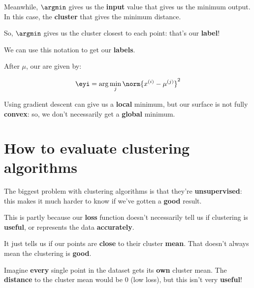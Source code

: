         Meanwhile, $\argmin$ gives us the \textbf{input} value that gives us the minimum output. In this case, the \textbf{cluster} that gives the minimum distance. 
        
        So, $\argmin$ gives us the cluster closest to each point: that's our \textbf{label}!
        
        We can use this notation to get our \textbf{labels}.\\
        
        \begin{notation}
            After  $\mu$, our  are given by:
            
            \begin{equation}
                \eyi = \arg\min_j \norm{ x^{(i)} - \mu^{(j)} }^2
            \end{equation}
        \end{notation}
        
        Using gradient descent can give us a \textbf{local} minimum, but our surface is not fully \textbf{convex}: so, we don't necessarily get a \textbf{global} minimum.

\pagebreak

\section{How to evaluate clustering algorithms}

    The biggest problem with clustering algorithms is that they're \textbf{unsupervised}: this makes it much harder to know if we've gotten a \textbf{good} result.
    
    This is partly because our \textbf{loss} function doesn't necessarily tell us if clustering is \textbf{useful}, or represents the data \textbf{accurately}.
    
    It just tells us if our points are \textbf{close} to their cluster \textbf{mean}. That doesn't always mean the clustering is \textbf{good}.
    
    \miniex Imagine \textbf{every} single point in the dataset gets its \textbf{own} cluster mean. The \textbf{distance} to the cluster mean would be 0 (low loss), but this isn't very \textbf{useful}!
        \\
    
